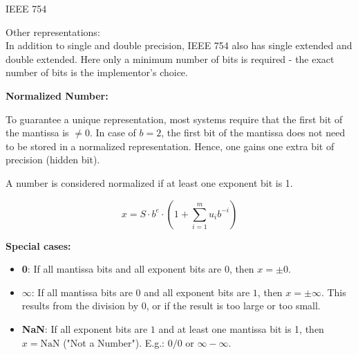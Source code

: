 \documentclass[11pt,compress,t,notes=noshow, xcolor=table]{beamer}
\begin{document}
\begin{vbframe}{IEEE 754}

\lz

Other representations:\\
In addition to single and double precision, IEEE 754 also has single extended and double extended. Here only a minimum number of bits is required - the exact number of bits is the implementor's choice.

\framebreak
\textbf{Normalized Number:}

To guarantee a unique representation, most systems require
that the first bit of the mantissa is $\neq 0$.
In case of $b=2$, the first bit of the mantissa does not need to be stored in a normalized representation.
Hence, one gains one extra bit of precision (hidden bit).

\lz
A number is considered normalized if at least one exponent bit is 1.

$$
x = S \cdot b^e \cdot (1 + \sum_{i=1}^m u_{i} b^{-i}) %
$$


\framebreak
\textbf{Special cases:}
\begin{itemize}
\item \textbf{0}: If all mantissa bits and all exponent bits are $0$, then $x = \pm 0$.
\item $\boldsymbol{\infty}$: If all mantissa bits are $0$ and all exponent bits are $1$, then $x = \pm\infty$. This results from the division by $0$, or if the result is too large or too small.
\item \textbf{NaN}:  If all exponent bits are $1$ and at least one mantissa bit is 1, then $x = \text{NaN}$ ("Not a Number"). E.g.: $0 / 0$ or $\infty - \infty$.
\end{itemize}


\end{vbframe}
\end{document}
